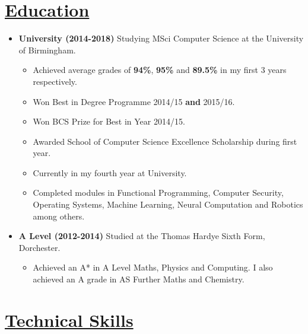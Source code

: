 \documentclass[11pt]{article}
\begin{document}
	\vspace{-30pt}
	\hspace{-100pt}\section*{\underline{Education}}
		\begin {itemize}
			\item \textbf{University (2014-2018)} Studying MSci Computer Science at the University of Birmingham.
				\begin{itemize}
					\item Achieved average grades of \textbf{94\%}, \textbf{95\%} and \textbf{89.5\%} in my first $3$ years respectively.
					\item Won Best in Degree Programme 2014/15 \textbf{and} 2015/16.
					\item Won BCS Prize for Best in Year 2014/15.
					\item Awarded School of Computer Science Excellence Scholarship during first year.
					\item Currently in my fourth year at University.
					\item Completed modules in Functional Programming, Computer Security, Operating Systems, Machine Learning, Neural Computation and Robotics among others.
				\end{itemize}
			\item \textbf{A Level (2012-2014)} Studied at the Thomas Hardye Sixth Form, Dorchester.
				\begin{itemize}
					\item Achieved an A* in A Level Maths, Physics and Computing. I also achieved an A grade in AS Further Maths and Chemistry.
				\end{itemize}
			
		\end{itemize}
	\vspace{-20pt}
	\hspace{-100pt}\section*{\underline{Technical Skills}}
\end{document}
